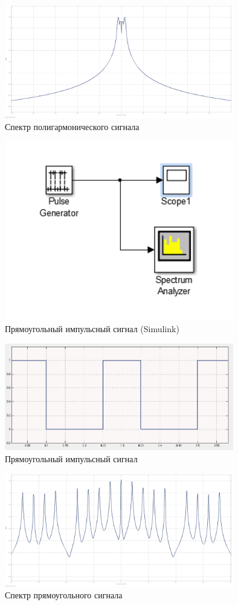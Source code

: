 \begin{figure}[H]
\centering
\includegraphics[width=10cm]{lab5/lab5_2_simulink}
\caption{Спектр полигармонического сигнала} 
\end{figure}

\begin{figure}[H]
\centering
\includegraphics[width=10cm]{lab5/3_simulink} 
\caption{Прямоугольный импульсный сигнал (Simulink)} 
\end{figure}

\begin{figure}[H]
\centering
\includegraphics[width=10cm]{lab5/lab5_3_simulink} 
\caption{Прямоугольный импульсный сигнал} 
\end{figure}

\begin{figure}[H]
\centering
\includegraphics[width=10cm]{lab5/lab5_4_simulink}
\caption{Спектр прямоугольного сигнала} 
\end{figure}

